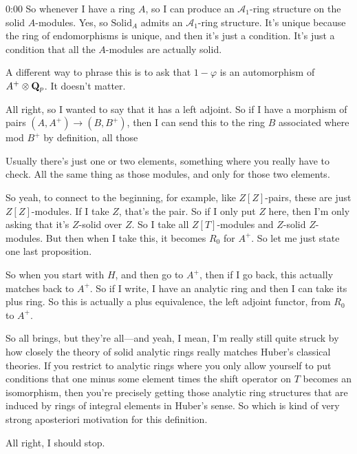 \begin{unfinished}{0:00}
So whenever I have a ring $A$, so I can produce an $\mathcal{A}_1$-ring structure on the solid $A$-modules. Yes, so $\mathrm{Solid}_A$ admits an $\mathcal{A}_1$-ring structure. It's unique because the ring of endomorphisms is unique, and then it's just a condition. It's just a condition that all the $A$-modules are actually solid.

A different way to phrase this is to ask that $1-\varphi$ is an automorphism of $A^+\otimes\mathbf Q_p$. It doesn't matter.

All right, so I wanted to say that it has a left adjoint. So if I have a morphism of pairs $(A,A^+)\to (B,B^+)$, then I can send this to the ring $B$ associated where mod $B^+$ by definition, all those

Usually there's just one or two elements, something where you really have to check. All the same thing as those modules, and only for those two elements.

So yeah, to connect to the beginning, for example, like $Z[Z]$-pairs, these are just $Z[Z]$-modules. If I take $Z$, that's the pair. So if I only put $Z$ here, then I'm only asking that it's $Z$-solid over $Z$. So I take all $Z[T]$-modules and $Z$-solid $Z$-modules. But then when I take this, it becomes $R_0$ for $A^+$. So let me just state one last proposition.

So when you start with $H$, and then go to $A^+$, then if I go back, this actually matches back to $A^+$. So if I write, I have an analytic ring and then I can take its plus ring. So this is actually a plus equivalence, the left adjoint functor, from $R_0$ to $A^+$.

So all brings, but they're all---and yeah, I mean, I'm really still quite struck by how closely the theory of solid analytic rings really matches Huber's classical theories. If you restrict to analytic rings where you only allow yourself to put conditions that one minus some element times the shift operator on $T$ becomes an isomorphism, then you're precisely getting those analytic ring structures that are induced by rings of integral elements in Huber's sense. So which is kind of very strong aposteriori motivation for this definition.

All right, I should stop.

\end{unfinished}